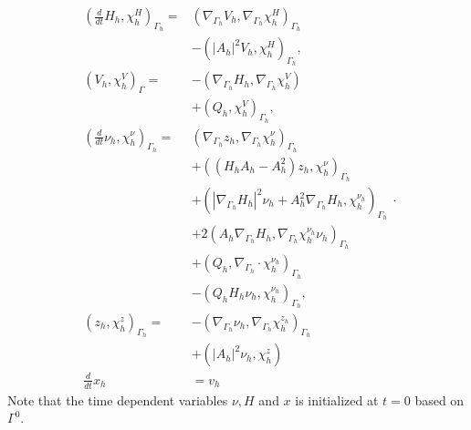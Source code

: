 
\begin{equation*}
    \begin{split}
\left( \frac{d}{dt}H_{h}, \chi_{h} ^{H} \right)_{\Gamma_{h} } =&  \left( \nabla _{\Gamma_{h} } V_{h}, \nabla _{\Gamma_{h} }\chi_{h} ^{H} \right) _{\Gamma_{h} } \nonumber \\
                                                   &- \left( \left\lvert A_{h} \right\rvert ^2 V_{h}, \chi_{h} ^{H} \right) _{\Gamma_{h} },   \\
\left( V_{h}, \chi_{h} ^{V} \right)_{\Gamma } =& -\left( \nabla _{\Gamma_{h} } H_{h}, \nabla _{\Gamma_{h} } \chi_{h} ^{V} \right) \nonumber \\
 & + \left( Q_{h}, \chi_{h} ^{V} \right)_{\Gamma_{h} },   \\
\left( \frac{d}{dt} \nu_{h} , \chi_{h} ^{\nu } \right)_{\Gamma_{h} } =& \left( \nabla _{\Gamma_{h} }z_{h}, \nabla _{\Gamma_{h} } \chi_{h} ^{\nu } \right) _{\Gamma_{h} }\nonumber   \\
 & + \left( ( H_{h}A_{h} - A_{h}^2  )z_{h},\chi_{h}^\nu  \right)_{\Gamma_{h} }   \nonumber \\
 & + \left( \left\lvert \nabla _{\Gamma_{h} } H_{h} \right\rvert^2 \nu_{h} + A_{h}^2\nabla _{\Gamma_{h} } H_{h}, \chi_{h} ^{\nu_{h} }  \right)_{\Gamma_{h}} \nonumber  \\
 & + 2 \left( A_{h} \nabla _{\Gamma_{h} } H_{h}, \nabla _{\Gamma_{h} } \chi_{h} ^{\nu_{h} } \nu_{h}  \right)_{\Gamma_{h}} \nonumber    \\
 &  + \left( Q_{h}, \nabla _{\Gamma_{h} } \cdot \chi_{h} ^{\nu_{h} }  \right)_{\Gamma_{h} } \nonumber  \\
  &- \left( Q_{h}H_{h}\nu_{h} , \chi_{h} ^{\nu_{h} } \right) _{\Gamma_{h}},\\
\left( z_{h}, \chi_{h} ^{z} \right) _{\Gamma_{h} }  =& - \left( \nabla _{\Gamma_{h} } \nu_{h} , \nabla _{\Gamma_{h} } \chi_{h} ^{z_{h}} \right)_{\Gamma_{h}} \nonumber \\
 & + \left( \left\lvert A_{h} \right\rvert ^2 \nu_{h} , \chi_{h} ^{z} \right) \\
\frac{d}{dt}x_h &= v_h
    \end{split}
.\end{equation*}
Note that the time dependent variables $\nu, H $ and $x$ is initialized at $t=0$  based on $\Gamma ^{0}$.













